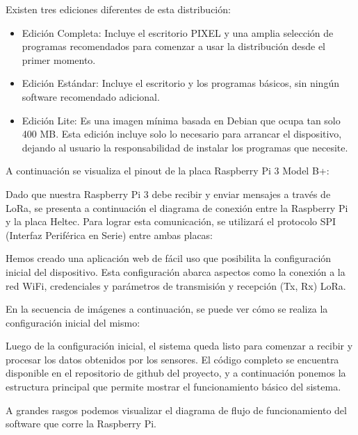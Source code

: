 Existen tres ediciones diferentes de esta distribución:

\begin{itemize}
    \item Edición Completa: Incluye el escritorio PIXEL y una amplia selección de programas recomendados para comenzar a usar la distribución desde el primer momento.
    \item Edición Estándar: Incluye el escritorio y los programas básicos, sin ningún software recomendado adicional.
    \item Edición Lite: Es una imagen mínima basada en Debian que ocupa tan solo 400 MB. Esta edición incluye solo lo necesario para arrancar el dispositivo, dejando al usuario la responsabilidad de instalar los programas que necesite.
\end{itemize}

A continuación se visualiza el pinout de la placa Raspberry Pi 3 Model B+:


Dado que nuestra Raspberry Pi 3 debe recibir y enviar mensajes a través de LoRa, se presenta a continuación el diagrama de conexión entre la Raspberry Pi y la placa Heltec. Para lograr esta comunicación, se utilizará el protocolo SPI (Interfaz Periférica en Serie) entre ambas placas:


Hemos creado una aplicación web de fácil uso que posibilita la configuración inicial del dispositivo. Esta configuración abarca aspectos como la conexión a la red WiFi, credenciales y parámetros de transmisión y recepción (Tx, Rx) LoRa.

En la secuencia de imágenes a continuación, se puede ver cómo se realiza la configuración inicial del mismo:

Luego de la configuración inicial, el sistema queda listo para comenzar a recibir y procesar los datos obtenidos por los sensores. El código completo se encuentra disponible en el repositorio de github del proyecto, y a continuación ponemos la estructura principal que permite mostrar el funcionamiento básico del sistema.

A grandes rasgos podemos visualizar el diagrama de flujo de funcionamiento del software que corre la Raspberry Pi.

